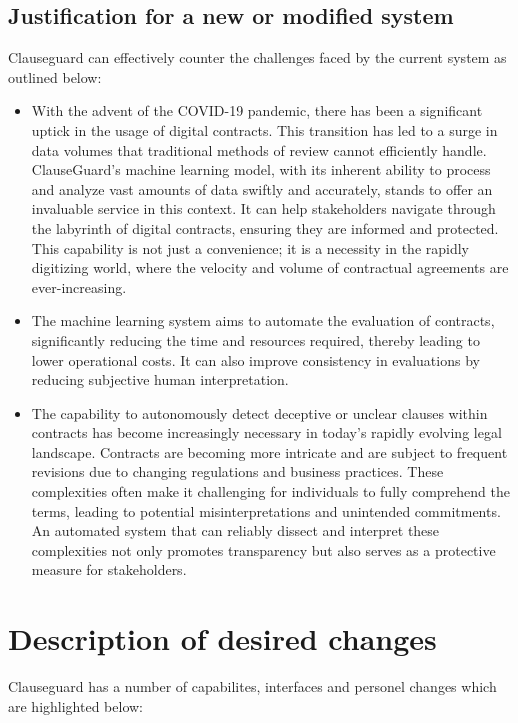 \begin{itemize}
    \subsection{Justification for a new or modified system}
    Clauseguard can effectively counter the challenges faced by the current system as outlined below: 
    \begin{itemize}
        \item With the advent of the COVID-19 pandemic, there has been a significant uptick in the usage of digital contracts. This transition has led to a surge in data volumes that traditional methods of review cannot efficiently handle. ClauseGuard's machine learning model, with its inherent ability to process and analyze vast amounts of data swiftly and accurately, stands to offer an invaluable service in this context. It can help stakeholders navigate through the labyrinth of digital contracts, ensuring they are informed and protected. This capability is not just a convenience; it is a necessity in the rapidly digitizing world, where the velocity and volume of contractual agreements are ever-increasing. 
        \item The machine learning system aims to automate the evaluation of contracts, significantly reducing the time and resources required, thereby leading to lower operational costs. It can also improve consistency in evaluations by reducing subjective human interpretation.
        \item The capability to autonomously detect deceptive or unclear clauses within contracts has become increasingly necessary in today's rapidly evolving legal landscape. Contracts are becoming more intricate and are subject to frequent revisions due to changing regulations and business practices. These complexities often make it challenging for individuals to fully comprehend the terms, leading to potential misinterpretations and unintended commitments. An automated system that can reliably dissect and interpret these complexities not only promotes transparency but also serves as a protective measure for stakeholders. 
    \end{itemize}
    
\end{itemize}


\section{Description of desired changes \label{Section::Description of desired changes}}
Clauseguard has a number of capabilites, interfaces and personel changes which are highlighted below: 

